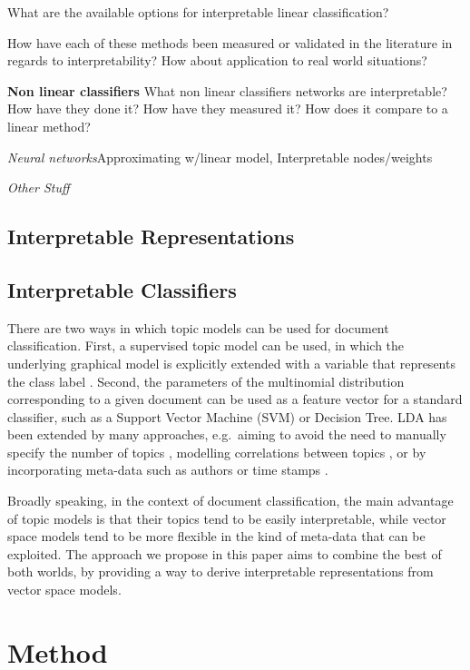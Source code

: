 What are the available options for interpretable linear classification?

How have each of these methods been measured or validated in the literature in regards to interpretability? How about application to real world situations?

\textbf{Non linear classifiers}
What non linear classifiers networks are interpretable? How have they done it? How have they measured it? How does it compare to a linear method?

\textit {Neural networks}Approximating w/linear model, Interpretable nodes/weights

\textit {Other Stuff}

\subsection{Interpretable Representations}


\subsection{Interpretable Classifiers}


There are two ways in which topic models can be used for document classification. First, a supervised topic model can be used, in which the underlying graphical model is explicitly extended with a variable that represents the class label \cite{Blei2010}. Second, the parameters of the multinomial distribution corresponding to a given document can be used as a feature vector for a standard classifier, such as a Support Vector Machine (SVM) or Decision Tree. LDA has been extended by many approaches, e.g.\ aiming to avoid the need to manually specify the number of topics \cite{teh2005sharing}, modelling correlations between topics \cite{Blei2006}, or by incorporating meta-data such as authors \cite{rosen2004author} or time stamps \cite{wang2006topics}.



Broadly speaking, in the context of document classification, the main advantage of topic models is that their topics tend to be easily interpretable, while vector space models tend to be more flexible in the kind of meta-data that can be exploited. The approach we propose in this paper aims to combine the best of both worlds, by providing a way to derive interpretable representations from vector space models.



\section{Method}


